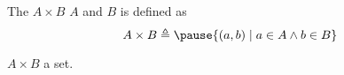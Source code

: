 
\begin{frame}{}
  \begin{definition}
    The  $A \times B$  $A$ and $B$ is defined as 
    \[
      {A \times B \triangleq \pause \set{(a, b) \mid a \in A \land b \in B}}
    \]
  \end{definition}

  \begin{theorem}
    $A \times B$  a set.
  \end{theorem}
\end{frame}

\begin{frame}{}
\end{frame}

\begin{frame}{}
  \begin{columns}
  \end{columns}
\end{frame}
